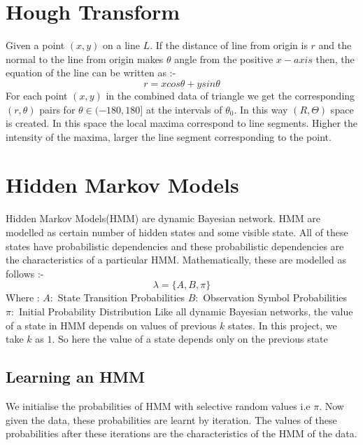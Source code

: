 \def\DevnagVersion{2.15}\documentclass[a4paper, 10pt, notitlepage]{report}
\begin{document}
\appendix
\chapter{Hough Transform}
\hspace*{10pt} Given a point $(x, y)$ on a line $L$. If the distance of line from origin is $r$ and the normal to the line from origin makes $\theta$ angle from the positive $x-axis$ then, the equation of the line can be written as :-\\
$$r = x cos\theta + y sin\theta$$
For each point $(x,y)$ in the combined data of triangle we get the corresponding $(r, \theta)$ pairs for $\theta \in (-180, 180]$ at the intervals of $\theta _ 0$. In this way $(R, \Theta)$ space is created. In this space the local maxima correspond to line segments. Higher the intensity of the maxima, larger the line segment corresponding to the point.\\

\chapter{Hidden Markov Models}
Hidden Markov Models(HMM) are dynamic Bayesian network. HMM are modelled as certain number of hidden states and some visible state. All of these states have probabilistic dependencies and these probabilistic dependencies are the characteristics of a particular HMM. Mathematically, these are modelled as follows :-\\
$$\lambda = \{A, B, \pi \}$$
Where : 
\hspace*{20pt} $A :$ State Transition Probabilities 
\hspace*{20pt} $B :$ Observation Symbol Probabilities
\hspace*{20pt} $\pi :$ Initial Probability Distribution
Like all dynamic Bayesian networks, the value of a state in HMM depends on values of  previous $k$ states. In this project, we take $k$ as $1$. So here the value of a state depends only on the previous state

\section{Learning an HMM }
We initialise the probabilities of HMM with selective random values i.e $\pi$. Now given the data, these probabilities are learnt by iteration. The values of these probabilities after these iterations are the characteristics of the HMM of the data.
\end{document}
